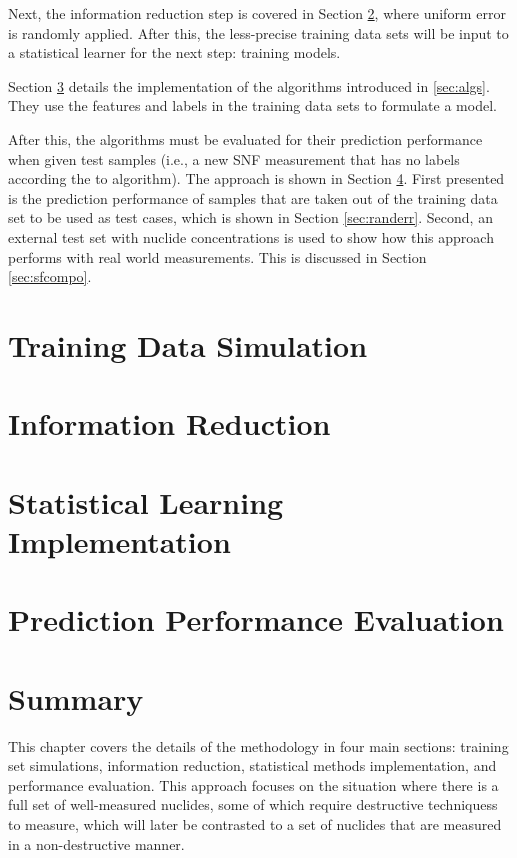 Next, the information reduction step is covered in Section
\ref{sec:inforeduc1}, where uniform error is randomly applied. After this, the
less-precise training data sets will be input to a statistical learner for the
next step: training models.

Section \ref{sec:statmodel1} details the implementation of the algorithms
introduced in \ref{sec:algs}. They use the features and labels in the training
data sets to formulate a model. 

After this, the algorithms must be evaluated for their prediction performance
when given test samples (i.e., a new \gls{SNF} measurement that has no labels
according the to algorithm).  The approach is shown in Section \ref{sec:eval1}.
First presented is the prediction performance of samples that are taken out of
the training data set to be used as test cases, which is shown in Section
\ref{sec:randerr}.  Second, an external test set with nuclide concentrations is
used to show how this approach performs with real world measurements. This is
discussed in Section \ref{sec:sfcompo}.  

\section{Training Data Simulation}
\label{sec:training1}


\section{Information Reduction}
\label{sec:inforeduc1}


\section{Statistical Learning Implementation}
\label{sec:statmodel1}


\section{Prediction Performance Evaluation}
\label{sec:eval1}


\section{Summary}

This chapter covers the details of the methodology in four main sections:
training set simulations, information reduction, statistical methods
implementation, and performance evaluation. This approach focuses on the
situation where there is a full set of well-measured nuclides, some of which
require destructive techniquess to measure, which will later be contrasted to a
set of nuclides that are measured in a non-destructive manner. 

